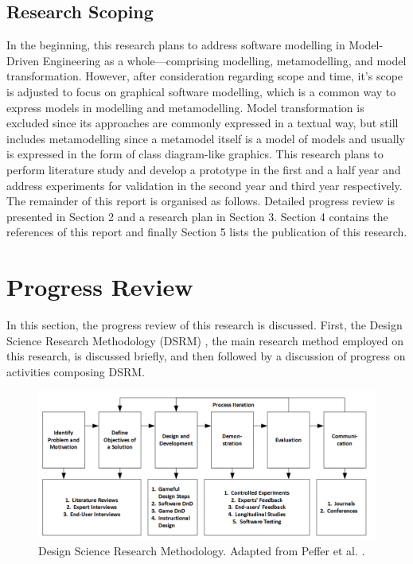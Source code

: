 \documentclass[12pt, a4paper]{report} \usepackage[titletoc]{appendix}
\begin{document}
\section{Research Scoping}
In the beginning, this research plans to address software modelling in Model-Driven Engineering as a whole---comprising modelling, metamodelling, and model transformation. However, after consideration regarding scope and time, it's scope is adjusted to focus on graphical software modelling, which is a common way to express models in modelling and metamodelling. Model transformation is excluded since its approaches are commonly expressed in a textual way, but still includes metamodelling since a metamodel itself is a model of models and usually is expressed in the form of class diagram-like graphics. This research plans to perform literature study and develop a prototype in the first and a half year and address experiments for validation in the second year and third year respectively.\newline\newline
The remainder of this report is organised as follows. Detailed
progress review is presented in Section 2 and a research plan in Section 3. Section 4 contains the references of this report and finally Section 5 lists the publication of this research.

\chapter{Progress Review}
\label{Progres Review}
In this section, the progress review of this research is discussed. First, the Design Science Research Methodology (DSRM) \cite{peffers2007design}, the main research method employed on this research, is discussed briefly, and then followed by a discussion of progress on activities composing DSRM.

\begin{figure}[ht] \centering \includegraphics[width=\textwidth]{dsrm}
\caption{Design Science Research Methodology. Adapted from Peffer et al. \cite{peffers2007design}.}
\label{dsrm}
\end{figure}
\end{document}
